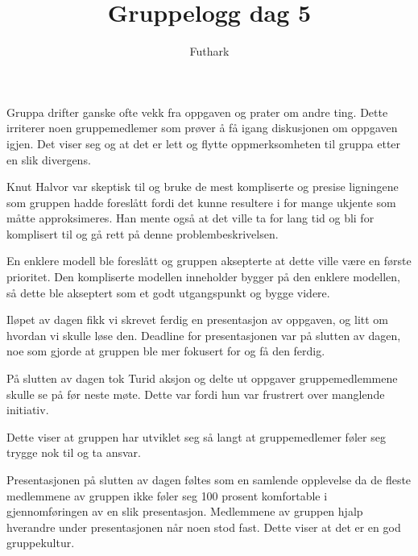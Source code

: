 \documentclass[11pt]{article}
\author{Futhark}
\title{Gruppelogg dag 5}
\begin{document}
\maketitle

Gruppa drifter ganske ofte vekk fra oppgaven og prater om andre ting. Dette irriterer
noen gruppemedlemer som prøver å få igang diskusjonen om oppgaven igjen. Det viser seg
og at det er lett og flytte oppmerksomheten til gruppa etter en slik divergens.

Knut Halvor var skeptisk til og bruke de mest kompliserte og presise ligningene som gruppen
hadde foreslått fordi det kunne resultere i for mange ukjente som måtte approksimeres. Han mente
også at det ville ta for lang tid og bli for komplisert til og gå rett på denne problembeskrivelsen.

En enklere modell ble foreslått og gruppen aksepterte at dette ville være en første prioritet.
Den kompliserte modellen inneholder bygger på den enklere modellen, så dette ble akseptert som et 
godt utgangspunkt og bygge videre.

Iløpet av dagen fikk vi skrevet ferdig en presentasjon av oppgaven, og litt om hvordan vi
skulle løse den. Deadline for presentasjonen var på slutten av dagen, noe som gjorde at gruppen
ble mer fokusert for og få den ferdig. 

På slutten av dagen tok Turid aksjon og delte ut oppgaver gruppemedlemmene skulle se på
før neste møte. Dette var fordi hun var frustrert over manglende initiativ.

Dette viser at gruppen har utviklet seg så langt at gruppemedlemer føler seg trygge nok til og
ta ansvar. 

Presentasjonen på slutten av dagen føltes som en samlende opplevelse da de fleste medlemmene
av gruppen ikke føler seg 100 prosent komfortable i gjennomføringen av en slik presentasjon. Medlemmene
av gruppen hjalp hverandre under presentasjonen når noen stod fast. Dette viser at det er en
god gruppekultur.
\end{document}
